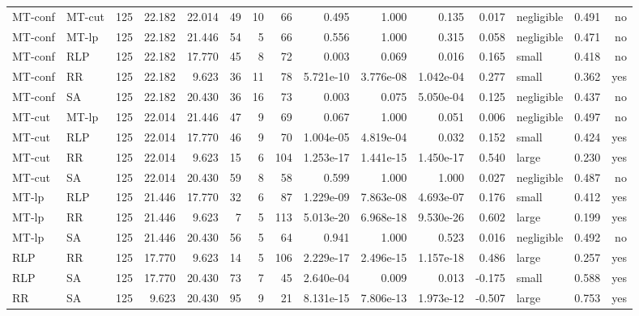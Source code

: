 \begin{table}[htbp]
\begin{tabular}{llrrrrrrrrrrlrr}
MT-conf & MT-cut & 125 & 22.182 & 22.014 & 49 & 10 & 66 & 0.495 & 1.000 & 0.135 & 0.017 & negligible & 0.491 & no \\
MT-conf & MT-lp & 125 & 22.182 & 21.446 & 54 & 5 & 66 & 0.556 & 1.000 & 0.315 & 0.058 & negligible & 0.471 & no \\
MT-conf & RLP & 125 & 22.182 & 17.770 & 45 & 8 & 72 & 0.003 & 0.069 & 0.016 & 0.165 & small & 0.418 & no \\
MT-conf & RR & 125 & 22.182 & 9.623 & 36 & 11 & 78 & 5.721e-10 & 3.776e-08 & 1.042e-04 & 0.277 & small & 0.362 & yes \\
MT-conf & SA & 125 & 22.182 & 20.430 & 36 & 16 & 73 & 0.003 & 0.075 & 5.050e-04 & 0.125 & negligible & 0.437 & no \\
MT-cut & MT-lp & 125 & 22.014 & 21.446 & 47 & 9 & 69 & 0.067 & 1.000 & 0.051 & 0.006 & negligible & 0.497 & no \\
MT-cut & RLP & 125 & 22.014 & 17.770 & 46 & 9 & 70 & 1.004e-05 & 4.819e-04 & 0.032 & 0.152 & small & 0.424 & yes \\
MT-cut & RR & 125 & 22.014 & 9.623 & 15 & 6 & 104 & 1.253e-17 & 1.441e-15 & 1.450e-17 & 0.540 & large & 0.230 & yes \\
MT-cut & SA & 125 & 22.014 & 20.430 & 59 & 8 & 58 & 0.599 & 1.000 & 1.000 & 0.027 & negligible & 0.487 & no \\
MT-lp & RLP & 125 & 21.446 & 17.770 & 32 & 6 & 87 & 1.229e-09 & 7.863e-08 & 4.693e-07 & 0.176 & small & 0.412 & yes \\
MT-lp & RR & 125 & 21.446 & 9.623 & 7 & 5 & 113 & 5.013e-20 & 6.968e-18 & 9.530e-26 & 0.602 & large & 0.199 & yes \\
MT-lp & SA & 125 & 21.446 & 20.430 & 56 & 5 & 64 & 0.941 & 1.000 & 0.523 & 0.016 & negligible & 0.492 & no \\
RLP & RR & 125 & 17.770 & 9.623 & 14 & 5 & 106 & 2.229e-17 & 2.496e-15 & 1.157e-18 & 0.486 & large & 0.257 & yes \\
RLP & SA & 125 & 17.770 & 20.430 & 73 & 7 & 45 & 2.640e-04 & 0.009 & 0.013 & -0.175 & small & 0.588 & yes \\
RR & SA & 125 & 9.623 & 20.430 & 95 & 9 & 21 & 8.131e-15 & 7.806e-13 & 1.973e-12 & -0.507 & large & 0.753 & yes \\
\bottomrule
\end{tabular}
\end{table}

